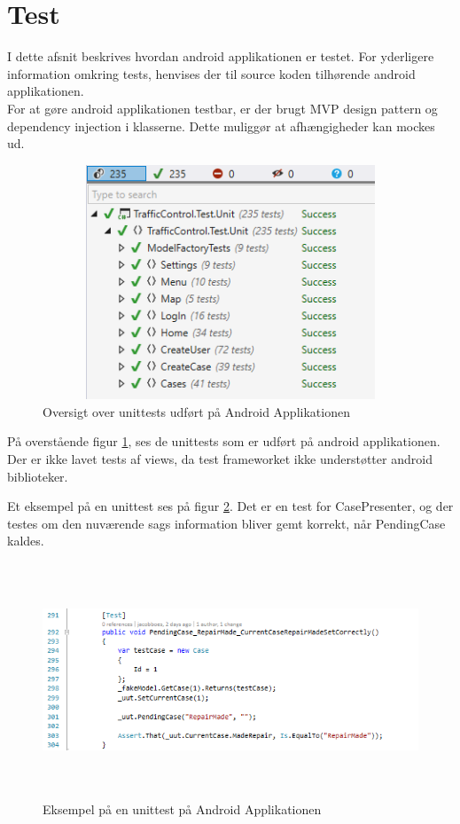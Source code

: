 	\pagebreak
	
	\section{Test}
	I dette afsnit beskrives hvordan android applikationen er testet. For yderligere information omkring tests, henvises der til source koden tilhørende android applikationen.
	\\	For at gøre android applikationen testbar, er der brugt MVP design pattern og dependency injection i klasserne. Dette muliggør at afhængigheder kan mockes ud. 
	
		\begin{figure} [!ht]
			\begin{center}
				\includegraphics[height=7cm,width=12cm]{Android/Billeder/AndroidTests}
			\end{center}
			\caption{Oversigt over unittests udført på Android Applikationen}
			\label{fig:AndroidTests}
		\end{figure}
		
	På overstående figur \ref{fig:AndroidTests}, ses de unittests som er udført på android applikationen. Der er ikke lavet tests af views, da test frameworket ikke understøtter android biblioteker.

	Et eksempel på en unittest ses på figur \ref{fig:AndroidUnitTestEksempel}. Det er en test for CasePresenter, og der testes om den nuværende sags information bliver gemt korrekt, når PendingCase kaldes.
	
	\begin{figure} [!ht]
		\begin{center}
			\includegraphics[height=7cm,width=17cm]{Android/Billeder/unittestEksempel}
		\end{center}
		\caption{Eksempel på en unittest på Android Applikationen}
		\label{fig:AndroidUnitTestEksempel}
	\end{figure}
			
	